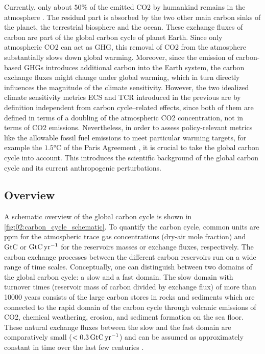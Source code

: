 Currently, only about $50 \unit{\%}$ of the emitted \ac{CO2} by humankind
remains in the atmosphere \autocite{Friedlingstein2020}. The residual part is
absorbed by the two other main carbon sinks of the planet, the terrestrial
biosphere and the ocean. These exchange fluxes of carbon are part of the global
carbon cycle of planet Earth. Since only atmospheric \ac{CO2} can act as
\ac{GHG}, this removal of \ac{CO2} from the atmosphere substantially slows down
global warming. Moreover, since the emission of carbon-based \acp{GHG}
introduces additional carbon into the Earth system, the carbon exchange fluxes
might change under global warming, which in turn directly influences the
magnitude of the climate sensitivity. However, the two idealized climate
sensitivity metrics \ac{ECS} and \ac{TCR} introduced in the previous
 are by definition independent from carbon
cycle--related effects, since both of them are defined in terms of a doubling
of the atmospheric \ac{CO2} concentration, not in terms of \ac{CO2} emissions.
Nevertheless, in order to assess policy-relevant metrics like the allowable
fossil fuel emissions to meet particular warming targets, for example the $1.5
\unit{\degreeCelsius}$ of the Paris Agreement \autocite{UNFCCC2015}, it is
crucial to take the global carbon cycle into account. This
 introduces the scientific background of the
global carbon cycle and its current anthropogenic perturbations.


\subsection{Overview}
\label{subsec:02:carbon_cycle_overview}

A schematic overview of the global carbon cycle is shown in
\cref{fig:02:carbon_cycle_schematic}. To quantify the carbon cycle, common
units are \ac{ppm} for the atmospheric trace gas concentrations (dry-air mole
fraction) and \ac{GtC} or $\si{\GtCyr{}}$ for the reservoirs masses or exchange
fluxes, respectively. The carbon exchange processes between the different
carbon reservoirs run on a wide range of time scales. Conceptually, one can
distinguish between two domains of the global carbon cycle: a slow and a fast
domain. The slow domain with turnover times (reservoir mass of carbon divided
by exchange flux) of more than 10000 years consists of the large carbon stores
in rocks and sediments which are connected to the rapid domain of the carbon
cycle through volcanic emissions of \ac{CO2}, chemical weathering, erosion, and
sediment formation on the sea floor. These natural exchange fluxes between the
slow and the fast domain are comparatively small ($< 0.3 \unit{\GtCyr{}}$) and
can be assumed as approximately constant in time over the last few centuries
\autocite{Ciais2013}.

